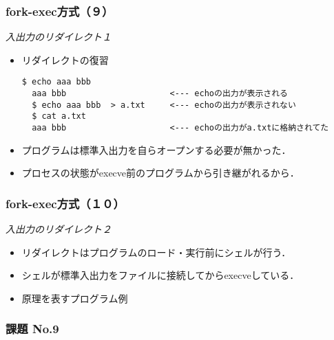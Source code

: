 \documentclass{beamer}                 %
\begin{document}
\begin{frame}[fragile]
  \frametitle{fork-exec方式（９）}
  \emph{入出力のリダイレクト１} \\
  \begin{itemize}
  \item リダイレクトの復習
\begin{lstlisting}[numbers=none]
  $ echo aaa bbb
  aaa bbb                     <--- echoの出力が表示される
  $ echo aaa bbb  > a.txt     <--- echoの出力が表示されない
  $ cat a.txt
  aaa bbb                     <--- echoの出力がa.txtに格納されてた
\end{lstlisting} %
  \item プログラムは標準入出力を自らオープンする必要が無かった．
  \item プロセスの状態がexecve前のプログラムから引き継がれるから．
  \end{itemize}
  \vfill
\end{frame}

\begin{frame}[fragile]
  \frametitle{fork-exec方式（１０）}
  \emph{入出力のリダイレクト２} \\
  \begin{itemize}
  \item リダイレクトはプログラムのロード・実行前にシェルが行う．
  \item シェルが標準入出力をファイルに接続してからexecveしている．
  \item 原理を表すプログラム例
  \end{itemize}
  \vfill
\end{frame}

\begin{frame}[fragile]
  \frametitle{課題 No.9}
   \vfill
\end{frame}
\end{document}
